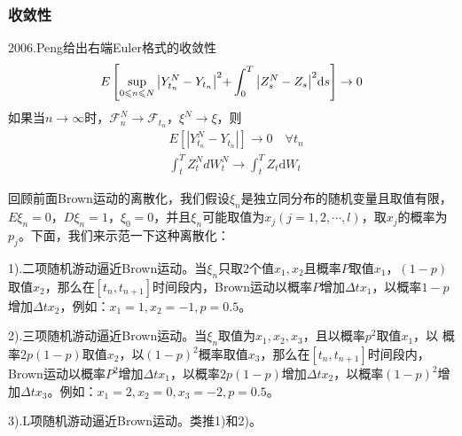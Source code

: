 		\subsubsection{收敛性}
			\par
			2006.Peng给出右端Euler格式的收敛性
			\begin{align*}
			E\left[ {\mathop {\sup }\limits_{0 \leqslant n \leqslant N} {{\left| {Y_{{t_n}}^N - {Y_{{t_n}}}} \right|}^2}{\rm{ + }}\int_0^T {{{\left| {Z_s^N - {Z_s}} \right|}^2}\mathrm{d}s} } \right] \rightarrow 0
			\end{align*}
			如果当$n \to \infty $时，${{\mathcal{F}}_n^N} \to {{\mathcal{F}}_{t_n}}$，$\xi ^N \to \xi$，则
			\begin{align*}
			&E\left[ {\left| {Y_{{t_n}}^N - {Y_{{t_n}}}} \right|} \right] \to 0\quad \forall {t_n}\\
			&\int_t^T {Z_t^NdW_t^N}  \to \int_t^T {{Z_t}\mathrm{d}{W_t}}
			\end{align*}
			\par
			回顾前面Brown运动的离散化，我们假设$\xi_n$是独立同分布的随机变量且取值有限，$E\xi_n =0$，$D\xi_n =1$，$\xi_0=0$，并且$\xi_n$可能取值为$x_j(j=1,2,\cdots,l)$，取$x_j$的概率为$p_j$。下面，我们来示范一下这种离散化：
			\par
			1).二项随机游动逼近Brown运动。当$\xi_n$只取2个值$x_1,x_2$且概率$P$取值$x_1$，$(1-p)$取值$x_2$，那么在$[t_n,t_{n+1}]$时间段内，Brown运动以概率$P$增加${\Delta t{x_1}}$，以概率$1-p$增加${\Delta t{x_2}}$，例如：$x_1=1,x_2=-1,p=0.5$。
			\par
			2).三项随机游动逼近Brown运动。当$\xi_n$取值为$x_1,x_2,x_3$，且以概率$p^2$取值$x_1$，以 概率$2p(1-p)$取值$x_2$，以$(1-p)^2$概率取值$x_3$，那么在$[t_n,t_{n+1}]$时间段内，Brown运动以概率$P^2$增加${\Delta t{x_1}}$，以概率$2p(1-p)$增加${\Delta t{x_2}}$，以概率$(1-p)^2$增加${\Delta t{x_3}}$。例如：$x_1=2,x_2=0,x_3=-2,p=0.5$。
			\par
			3).L项随机游动逼近Brown运动。类推1)和2)。

